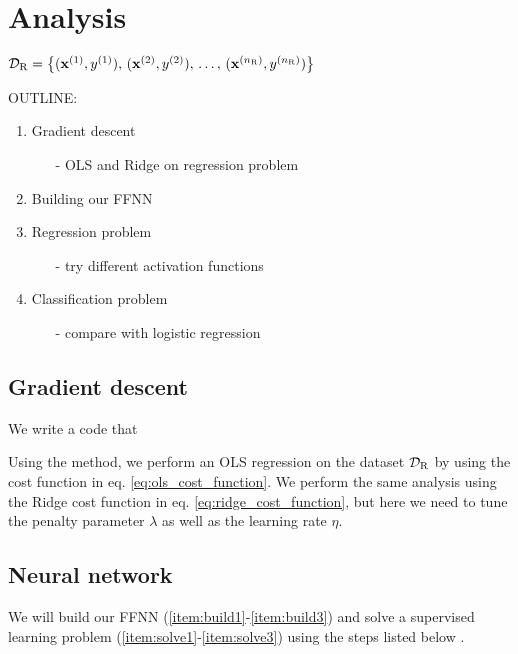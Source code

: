 \section{Analysis}\label{sec:analysis}


$\mathcal{D}_\mathrm{R} = \big\{ (\mathbf{x}^{(1)}, y^{(1)}), \,  (\mathbf{x}^{(2)}, y^{(2)}), \,\dots, \, (\mathbf{x}^{({n_\mathrm{R}})}, y^{(n_\mathrm{R})}) \big\}$ 



OUTLINE:
\begin{enumerate}
    \item Gradient descent \begin{enumerate}
        \item[-] OLS and Ridge on regression problem
    \end{enumerate}
    \item Building our FFNN
    \item Regression problem \begin{enumerate}
        \item[-] try different activation functions
    \end{enumerate}
    \item Classification problem \begin{enumerate}
        \item[-] compare with logistic regression 
    \end{enumerate}
\end{enumerate}

\subsection{Gradient descent}

    We write a code that  \fillertext


    Using the  method, we perform an OLS regression on the dataset $\mathcal{D}_\mathrm{R}$ by using the cost function in eq. \eqref{eq:ols_cost_function}. We perform the same analysis using the Ridge cost function in eq. \eqref{eq:ridge_cost_function}, but here we need to tune the penalty parameter $\lambda$ as well as the learning rate $\eta$.




    
\subsection{Neural network}
    We will build our FFNN (\ref{item:build1}-\ref{item:build3}) and solve a supervised learning problem (\ref{item:solve1}-\ref{item:solve3}) using the steps listed below \citep{mhjensen}.

